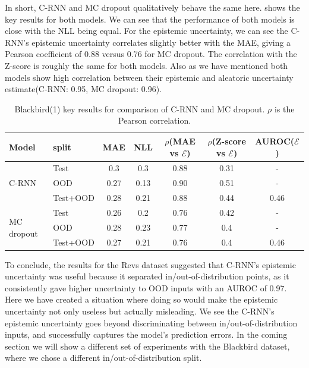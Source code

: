In short, C-RNN and MC dropout qualitatively behave the same here.  shows the key results for both models. We can see that the performance of both models is close with the NLL being equal. For the epistemic uncertainty, we can see the C-RNN's epistemic uncertainty correlates slightly better with the MAE, giving a Pearson coefficient of 0.88 versus 0.76 for MC dropout. The correlation with the Z-score is roughly the same for both models. Also as we have mentioned both models show high correlation between their epistemic and aleatoric uncertainty estimate(C-RNN: 0.95, MC dropout: 0.96).  


\begin{table}[h]
\centering
    \begin{tabular}{l l c c c c c}  
        \toprule
        Model & split & MAE & NLL & $\rho$(MAE vs $\mathcal{E}$) &
        $\rho$(Z-score vs $\mathcal{E}$) & AUROC($\mathcal{E}$)\\
        \midrule
        \multirow{3}{*}{C-RNN} 
            & Test     & 0.3  & 0.3  & 0.88  & 0.31 & - \\  
            & OOD      & 0.27 & 0.13 & 0.90  & 0.51 & -\\  
            & Test+OOD & 0.28 & 0.21 & 0.88  & 0.44 & 0.46\\ 

        \midrule
        \multirow{3}{*}{MC dropout} 
            & Test     & 0.26 & 0.2  & 0.76  & 0.42 & - \\  
            & OOD      & 0.28 & 0.23 & 0.77  & 0.4 & -\\  
            & Test+OOD & 0.27 & 0.21 & 0.76  & 0.4 & 0.46\\ 

        \toprule
    \end{tabular}
    \caption{Blackbird(1) key results for comparison of C-RNN and MC dropout. $\rho$ is the Pearson correlation.}
    \label{tbl:bb1_comparison}
\end{table}


To conclude, the results for the Revs dataset suggested that C-RNN's epistemic uncertainty was useful because it separated in/out-of-distribution points, as it consistently gave higher uncertainty to OOD inputs with an AUROC of 0.97. Here we have created a situation where doing so would make the epistemic uncertainty not only useless but actually misleading. We see the C-RNN's epistemic uncertainty goes beyond discriminating between in/out-of-distribution inputs, and successfully captures the model's prediction errors. In the coming section we will show a different set of experiments with the Blackbird dataset, where we chose a different in/out-of-distribution split. 
